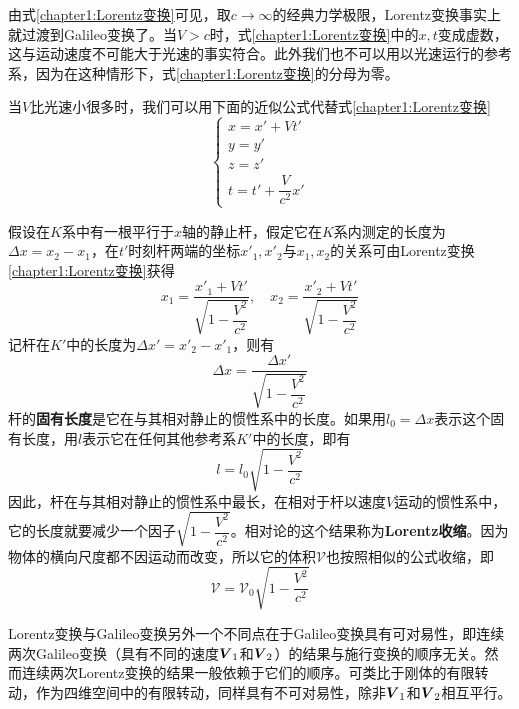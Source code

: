 由式\eqref{chapter1:Lorentz变换}可见，取$c\to\infty$的经典力学极限，Lorentz变换事实上就过渡到Galileo变换了。当$V>c$时，式\eqref{chapter1:Lorentz变换}中的$x,t$变成虚数，这与运动速度不可能大于光速的事实符合。此外我们也不可以用以光速运行的参考系，因为在这种情形下，式\eqref{chapter1:Lorentz变换}的分母为零。

当$V$比光速小很多时，我们可以用下面的近似公式代替式\eqref{chapter1:Lorentz变换}
\begin{equation}
\begin{cases}
	x = x'+Vt' \\
	y = y' \\
	z = z' \\
	t = t'+\dfrac{V}{c^2}x'
\end{cases}
\label{chapter1:近似的Lorentz变换}
\end{equation}

假设在$K$系中有一根平行于$x$轴的静止杆，假定它在$K$系内测定的长度为$\Delta x=x_2-x_1$，在$t'$时刻杆两端的坐标$x'_1,x'_2$与$x_1,x_2$的关系可由Lorentz变换\eqref{chapter1:Lorentz变换}获得
\begin{equation*}
	x_1 = \frac{x'_1 + Vt'}{\sqrt{1-\dfrac{V^2}{c^2}}},\quad x_2 = \frac{x'_2 + Vt'}{\sqrt{1-\dfrac{V^2}{c^2}}}
\end{equation*}
记杆在$K'$中的长度为$\Delta x'= x'_2-x'_1$，则有
\begin{equation*}
	\Delta x = \frac{\Delta x'}{\sqrt{1-\dfrac{V^2}{c^2}}}
\end{equation*}
杆的{\bf 固有长度}是它在与其相对静止的惯性系中的长度。如果用$l_0 = \Delta x$表示这个固有长度，用$l$表示它在任何其他参考系$K'$中的长度，即有
\begin{equation}
	l = l_0\sqrt{1-\frac{V^2}{c^2}}
	\label{chapter1:固有长度}
\end{equation}
因此，杆在与其相对静止的惯性系中最长，在相对于杆以速度$V$运动的惯性系中，它的长度就要减少一个因子$\sqrt{1-\dfrac{V^2}{c^2}}$。相对论的这个结果称为{\bf Lorentz收缩}。因为物体的横向尺度都不因运动而改变，所以它的体积$\mathscr{V}$也按照相似的公式收缩，即
\begin{equation}
	\mathscr{V} = \mathscr{V}_0\sqrt{1-\frac{V^2}{c^2}}
	\label{chapter1:固有体积}
\end{equation}

Lorentz变换与Galileo变换另外一个不同点在于Galileo变换具有可对易性，即连续两次Galileo变换（具有不同的速度$\boldsymbol{V}_1$和$\boldsymbol{V}_2$）的结果与施行变换的顺序无关。然而连续两次Lorentz变换的结果一般依赖于它们的顺序。可类比于刚体的有限转动，作为四维空间中的有限转动，同样具有不可对易性，除非$\boldsymbol{V}_1$和$\boldsymbol{V}_2$相互平行。

